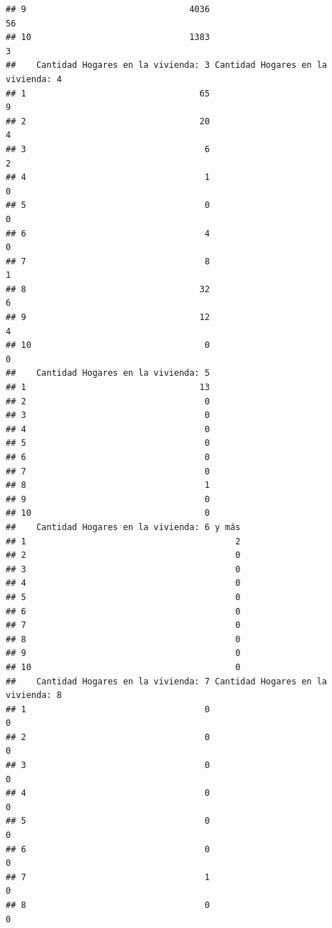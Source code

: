 \documentclass[11pt,]{article}
\begin{document}
\begin{verbatim}
## 9                                4036                                 56
## 10                               1383                                  3
##    Cantidad Hogares en la vivienda: 3 Cantidad Hogares en la vivienda: 4
## 1                                  65                                  9
## 2                                  20                                  4
## 3                                   6                                  2
## 4                                   1                                  0
## 5                                   0                                  0
## 6                                   4                                  0
## 7                                   8                                  1
## 8                                  32                                  6
## 9                                  12                                  4
## 10                                  0                                  0
##    Cantidad Hogares en la vivienda: 5
## 1                                  13
## 2                                   0
## 3                                   0
## 4                                   0
## 5                                   0
## 6                                   0
## 7                                   0
## 8                                   1
## 9                                   0
## 10                                  0
##    Cantidad Hogares en la vivienda: 6 y más
## 1                                         2
## 2                                         0
## 3                                         0
## 4                                         0
## 5                                         0
## 6                                         0
## 7                                         0
## 8                                         0
## 9                                         0
## 10                                        0
##    Cantidad Hogares en la vivienda: 7 Cantidad Hogares en la vivienda: 8
## 1                                   0                                  0
## 2                                   0                                  0
## 3                                   0                                  0
## 4                                   0                                  0
## 5                                   0                                  0
## 6                                   0                                  0
## 7                                   1                                  0
## 8                                   0                                  0

\end{verbatim}
\end{document}
